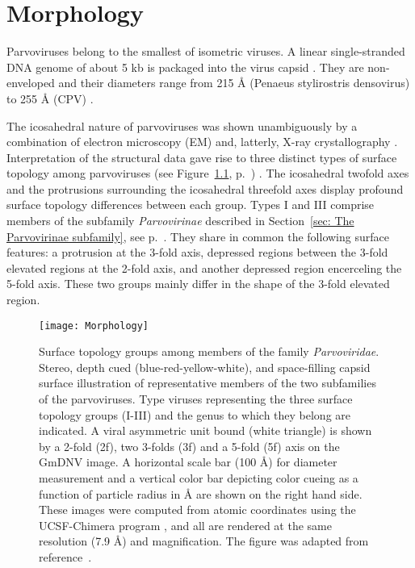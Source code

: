 
\chapter{Morphology} %

\label{Chapter3} %



\label{sec:Morphology}

Parvoviruses belong to the smallest of isometric viruses. A linear single-stranded DNA genome of about 5 kb is packaged into the virus capsid \cite{pmid4975639, pmid5264145, pmid5429749}. They are non-enveloped and their diameters range from 215 \r{A} (Penaeus stylirostris densovirus) to 255 \r{A} (CPV) \cite{pmid10497831, icvt}. 

The icosahedral nature of parvoviruses was shown unambiguously by a combination of electron microscopy (EM) and, latterly, X-ray crystallography \cite{pmid2006420}. Interpretation of the structural data gave rise to three distinct types of surface topology among parvoviruses (see Figure~\ref{Morphology}, p.~\pageref{Morphology}) \cite{pmid15795290}. The icosahedral twofold axes and the protrusions surrounding the icosahedral threefold axes display profound surface topology differences between each group. Types I and III comprise members of the subfamily \textit{Parvovirinae} described in Section~\ref{sec: The Parvovirinae subfamily}, see p.~\pageref{sec: The Parvovirinae subfamily}. They share in common the following surface features: a protrusion at the 3-fold axis, depressed regions between the 3-fold elevated regions at the 2-fold axis, and another depressed region encerceling the 5-fold axis. These two groups mainly differ in the shape of the 3-fold elevated region. 

\bigskip
\begin{figure}[H] 
\centering
\texttt{[image: Morphology]}
\caption[Parvovirus Surface Topology Groups]{Surface topology groups among members of the family \textit{Parvoviridae}. Stereo, depth cued (blue-red-yellow-white), and space-filling capsid surface illustration of representative members of the two subfamilies of the parvoviruses. Type viruses representing the three surface topology groups (I-III) and the genus to which they belong are indicated. A viral asymmetric unit bound (white triangle) is shown by a 2-fold (2f), two 3-folds (3f) and a 5-fold (5f) axis on the GmDNV image. A horizontal scale bar (100 \r{A}) for diameter measurement and a vertical color bar depicting color cueing as a function of particle radius in \r{A} are shown on the right hand side. These images were computed from atomic coordinates using the UCSF-Chimera program \cite{pmid15264254}, and all are rendered at the same resolution (7.9 \r{A}) and magnification. The figure was adapted from reference~\cite{pmid20375175}.}
\label{Morphology}
\end{figure}

